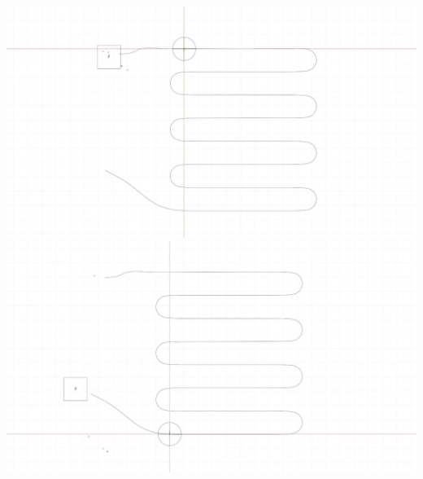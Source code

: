 \includegraphics[width=\textwidth]{gfx/prod/plane/flightpath1.jpg}
\includegraphics[width=\textwidth]{gfx/prod/plane/flightpath2.jpg}



